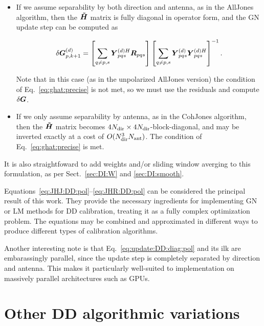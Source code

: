 \documentclass[useAMS,usenatbib]{mn2e}
\newcommand{\mat}[1]{{\bmath{#1}}}
\newcommand{\HHa}{\mat{\tilde{H}}} %
\newcommand{\RR}{\mat{R}}
\newcommand{\GG}{\mat{G}}
\begin{document}
\begin{itemize} 

\item If we assume separability by both direction and antenna, as in the {\sc AllJones} algorithm, then
the $\HHa$ matrix is fully diagonal in operator form, and the GN update step can be computed as

\begin{equation}
\label{eq:update:DD:diag:pol}
\delta \GGd_{p,k+1} = 
\left [ \sum\limits_{q\ne p,s} \YYdH_{pqs} \RR_{pqs} \right ]
\left [ \sum\limits_{q\ne p,s} \YYd_{pqs} \YYdH_{pqs}  \right ]^{-1}.
\end{equation}

Note that in this case (as in the unpolarized {\sc AllJones} version) the condition of Eq.~\ref{eq:ghat:precise}
is not met, so we must use the residuals and compute $\delta\GG$.

\item If we only assume separability by antenna, as in the {\sc CohJones} algorithm, then the $\HHa$ matrix 
becomes $4N_\mathrm{dir}\times4N_\mathrm{dir}$-block-diagonal, and may be inverted exactly at a cost of $O(N_\mathrm{dir}^3N_\mathrm{ant})$. The condition 
of Eq.~\ref{eq:ghat:precise} is met.
\end{itemize}

It is also straightfoward to add weights and/or sliding window averging to this formulation, as per 
Sect.~\ref{sec:DI:W} and \ref{sec:DI:smooth}.

Equations~\ref{eq:JHJ:DD:pol}--\ref{eq:JHR:DD:pol} can be considered the principal result of this work.
They provide the necessary ingredients for implementing GN or LM methods for DD calibration, treating it as a 
fully complex optimization problem. The equations may be combined and approximated in different 
ways to produce different types of calibration algorithms. 

Another interesting note is that Eq.~\ref{eq:update:DD:diag:pol} and its ilk are embarassingly parallel, since the update step is 
completely separated by direction and antenna. This makes it particularly well-suited to implementation on massively 
parallel architectures such as GPUs.

\section{Other DD algorithmic variations}
\label{sec:variations}
\end{document}
